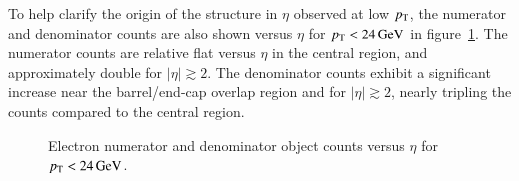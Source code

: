 To help clarify the origin of the structure in $\eta$ observed at low $p_{\text{T}}$, the numerator and denominator counts are also shown versus $\eta$ for $p_{\text{T}}<\SI{24}{\giga\electronvolt}$ in figure~\ref{fig:electron-num-den-eta-lowpt}. The numerator counts are relative flat versus $\eta$ in the central region, and approximately double for $|\eta|\gtrsim 2$. The denominator counts exhibit a significant increase near the barrel/end-cap overlap region and for $|\eta|\gtrsim 2$, nearly tripling the counts compared to the central region. 

\begin{figure}[h]
  \centering
  \caption{Electron numerator and denominator object counts versus $\eta$ for $p_{\text{T}}<\SI{24}{\giga\electronvolt}$.}
  \label{fig:electron-num-den-eta-lowpt}
\end{figure}


